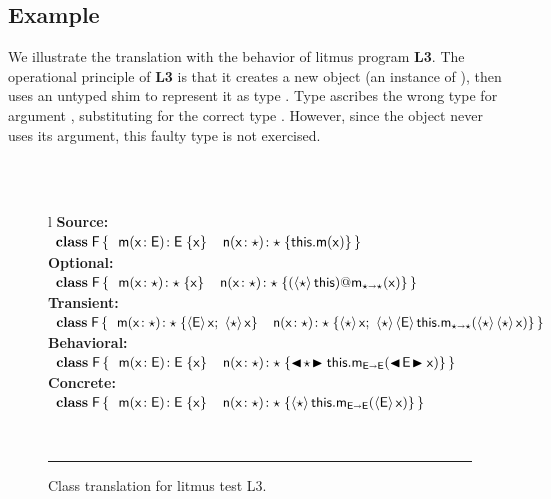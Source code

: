 \documentclass[USenglish]{tex/lipics-v2016}
\begin{document}
\subsection{Example}

We illustrate the translation with the behavior of litmus program {\bf L3}.
The operational principle of {\bf L3} is that it creates a new object (an
instance of \C), then uses an untyped shim to represent it as type \E. Type
\E ascribes the wrong type for argument \x, substituting \D for the correct
type \C. However, since the object never uses its argument, this faulty type
is not exercised.

\begin{figure}[!h]\small
\hrulefill\\
\\
\begin{tabular}{l}
{\bf Source:} \\[2mm]
\(
\begin{array}{l@{\,}l}
\Class{\xt F}{}{&\Mdef\m\x{\xt E}{\xt E}\x \HS\HS
    \Mdef\n\x\any\any{\Call\this\m\x}} \\
\end{array}
\) \\[2mm]
{\bf Optional:}\\[2mm]
\(
\begin{array}{l@{\,}l}
\Class{\xt F}{}{&\Mdef\m\x{\any}{\any}\x  \HS\HS
    \Mdef\n\x\any\any{\DynCall{(\SubCast\any\this)}\m\x}} 
\end{array}
\) \\[2mm]
{\bf Transient:}\\[2mm]
\(
\begin{array}{l@{\,}l}
\Class{\xt F}{}{
   &\Mdef\m\x\any\any{\SubCast{\xt E}{\x}; ~ \SubCast{\any}{\x} } 
    \HS\HS \Mdef\n\x\any\any{\SubCast{\any}{\x}\sspce 
   \SubCast{\any}{\SubCast{\xt E}{\KCall\this\m{\SubCast\any{\SubCast\any\x}}\any\any}}}} 
\end{array}
\)\\[2mm]
{\bf Behavioral:} \\[2mm]
\(
\begin{array}{l@{\,}l}
\Class{\xt F}{}{&\Mdef\m\x{\xt E}{\xt E}\x \HS\HS
      \Mdef\n\x\any\any{\BehCast\any{\KCall\this\m{\BehCast{\xt E}\x}{\xt E}{\xt E}}}} 
\end{array}
\) \\[2mm]
{\bf Concrete:} \\[2mm]
\(
\begin{array}{l@{\,}l}
\Class{\xt F}{}{&\Mdef\m\x{\xt E}{\xt E}\x  \HS\HS
       \Mdef\n\x\any\any{\SubCast\any{\KCall\this\m{\SubCast{\xt E}\x}{\xt E}{\xt E}}}} 
\end{array}
\) \\
\end{tabular}\vspace{2mm}\\
\hrule\vspace{4mm}

 \caption{Class translation for litmus test L3.} \label{fig:l3trans}
\end{figure}
\end{document}
